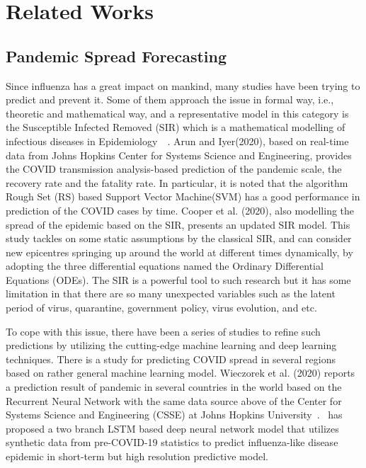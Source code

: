 \section{Related Works}
\subsection{Pandemic Spread Forecasting}
Since influenza has a great impact on mankind, many studies have been trying
to predict and prevent it. Some of them approach the issue in formal way,
i.e., theoretic and mathematical way, and a representative model in this
category is the Susceptible Infected Removed (SIR) which is a mathematical
modelling of infectious diseases in Epidemiology~\cite
{arun2020analysis}~\cite{cooper2020sir}. Arun and Iyer(2020), based on
real-time data from Johns Hopkins Center for Systems Science and Engineering,
provides the COVID transmission analysis-based prediction of the pandemic
scale, the recovery rate and the fatality rate. In particular, it is noted
that the algorithm Rough Set (RS) based Support Vector Machine(SVM) has a
good performance in prediction of the COVID cases by time. Cooper et al.
(2020), also modelling the spread of the epidemic based on the SIR, presents
an updated SIR model. This study tackles on some static assumptions by the
classical SIR, and can consider new epicentres springing up around the world
at different times dynamically, by adopting the three differential equations
named the Ordinary Differential Equations (ODEs). The SIR is a powerful tool
to such research but it has some limitation in that there are so many
unexpected variables such as the latent period of virus, quarantine,
government policy, virus evolution, and etc.

To cope with this issue, there have been a series of studies to refine such
predictions by utilizing the cutting-edge machine learning and deep learning
techniques. There is a study for predicting COVID spread in several regions
based on rather general machine learning model. Wieczorek et al.
(2020) reports a prediction result of pandemic in several countries in the
world based on the Recurrent Neural Network with the same data source above
of the Center for Systems Science and Engineering (CSSE) at Johns Hopkins
University~\cite{wieczorek2020neural}.~\cite{wang2019defsi} has proposed a
two branch LSTM based deep neural network model that utilizes synthetic data
from pre-COVID-19 statistics to predict influenza-like disease epidemic in
short-term but high resolution predictive model.

